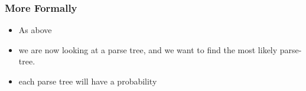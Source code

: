 \documentclass[11pt]{article}
\begin{document}
\subsubsection{More Formally}

\begin{minipage}[l]{.5\linewidth}
    \begin{figure}[H]
        \centering
    \end{figure}    
\end{minipage}\hfill
\begin{minipage}[r]{.48\linewidth}
    \begin{itemize}
        \item As above
    \end{itemize}
\end{minipage}

\begin{minipage}[l]{.5\linewidth}
    \begin{figure}[H]
        \centering
    \end{figure}    
\end{minipage}\hfill
\begin{minipage}[r]{.48\linewidth}
    \begin{itemize}
        \item we are now looking at a parse tree, and we want to find the most likely parse-tree.
        \item each parse tree will have a probability
    \end{itemize}
\end{minipage}
\end{document}
